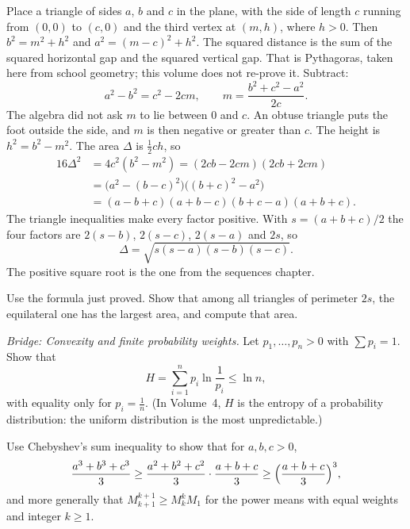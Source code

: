 \begin{examplex}
Place a triangle of sides $a$, $b$ and $c$ in the plane, with the side of length $c$ running from $(0,0)$ to $(c,0)$ and the third vertex at $(m,h)$, where $h>0$. Then $b^2=m^2+h^2$ and $a^2=(m-c)^2+h^2$. The squared distance is the sum of the squared horizontal gap and the squared vertical gap. That is Pythagoras, taken here from school geometry; this volume does not re-prove it. Subtract:
\[
a^2-b^2=c^2-2cm,\qquad m=\frac{b^2+c^2-a^2}{2c}.
\]
The algebra did not ask $m$ to lie between $0$ and $c$. An obtuse triangle puts the foot outside the side, and $m$ is then negative or greater than $c$. The height is $h^2=b^2-m^2$. The area $\Delta$ is $\frac12 ch$, so
\begin{align*}
16\Delta^2
&=4c^2(b^2-m^2)=(2cb-2cm)(2cb+2cm)\\
&=\bigl(a^2-(b-c)^2\bigr)\bigl((b+c)^2-a^2\bigr)\\
&=(a-b+c)(a+b-c)(b+c-a)(a+b+c).
\end{align*}
The triangle inequalities make every factor positive. With $s=(a+b+c)/2$ the four factors are $2(s-b)$, $2(s-c)$, $2(s-a)$ and $2s$, so
\[
\Delta=\sqrt{s(s-a)(s-b)(s-c)}.
\]
The positive square root is the one from the sequences chapter.
\end{examplex}

\begin{exercise}[$\star\star$]\label{ex:heron}
Use the formula just proved. Show that among all triangles of perimeter $2s$, the equilateral one has the largest area, and compute that area.
\end{exercise}

\begin{exercise}[$\star\star$]\label{ex:entropy}
\emph{Bridge: Convexity and finite probability weights.}
Let $p_1,\dots,p_n>0$ with $\sum p_i=1$. Show that
\[
H=\sum_{i=1}^np_i\ln\frac1{p_i}\le\ln n,
\]
with equality only for $p_i=\frac1n$. (In Volume~4, $H$ is the entropy of a probability distribution: the uniform distribution is the most unpredictable.)
\end{exercise}

\begin{exercise}[$\star\star$]\label{ex:chebsumapp}
Use Chebyshev's sum inequality to show that for $a,b,c>0$,
\[
\frac{a^3+b^3+c^3}3\ge\frac{a^2+b^2+c^2}3\cdot\frac{a+b+c}3\ge\Bigl(\frac{a+b+c}3\Bigr)^3,
\]
and more generally that $M_{k+1}^{k+1}\ge M_k^kM_1$ for the power means with equal weights and integer $k\ge1$.
\end{exercise}

